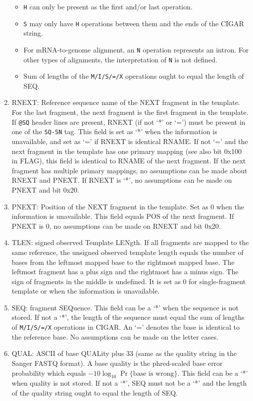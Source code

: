 \documentclass[10pt]{article}
\begin{document}
\begin{enumerate}
\begin{center}
  \end{center}
  \begin{itemize}
  \item {\tt H} can only be present as the first and/or last operation.
  \item {\tt S} may only have {\tt H} operations between them and the
    ends of the {\sf CIGAR} string.
  \item For mRNA-to-genome alignment, an {\tt N} operation represents an
    intron. For other types of alignments, the interpretation of {\tt N}
    is not defined.
  \item Sum of lengths of the {\tt M/I/S/=/X} operations ought to equal
    the length of {\sf SEQ}.
  \end{itemize}
\item {\sf RNEXT}: Reference sequence name of the NEXT fragment in the
  template. For the last fragment, the next fragment is the first
  fragment in the template. If {\tt @SQ} header lines are present, {\sf
    RNEXT} (if not `*' or `=') must be present in one of the {\tt SQ-SN}
  tag. This field is set as `*' when the information is unavailable, and
  set as `=' if {\sf RNEXT} is identical {\sf RNAME}. If not `=' and the
  next fragment in the template has one primary mapping (see also bit
  0x100 in {\sf FLAG}), this field is identical to {\sf RNAME} of the
  next fragment.  If the next fragment has multiple primary mappings, no
  assumptions can be made about {\sf RNEXT} and {\sf PNEXT}.  If {\sf
    RNEXT} is `*', no assumptions can be made on {\sf PNEXT} and bit
  0x20.
\item {\sf PNEXT}: Position of the NEXT fragment in the template. Set as
  0 when the information is unavailable. This field equals {\sf POS} of
  the next fragment. If {\sf PNEXT} is 0, no assumptions can be made on
  {\sf RNEXT} and bit 0x20.
\item {\sf TLEN}: signed observed Template LENgth. If all fragments are
  mapped to the same reference, the unsigned observed template length
  equals the number of bases from the leftmost mapped base to the
  rightmost mapped base. The leftmost fragment has a plus sign and the
  rightmost has a minus sign. The sign of fragments in the middle is
  undefined. It is set as 0 for single-fragment template or when the
  information is unavailable.
\item {\sf SEQ}: fragment SEQuence. This field can be a `*' when the
  sequence is not stored. If not a `*', the length of the sequence must
  equal the sum of lengths of {\tt M/I/S/=/X} operations in {\sf CIGAR}.
  An `=' denotes the base is identical to the reference base. No
  assumptions can be made on the letter cases.
\item {\sf QUAL}: ASCII of base QUALity plus 33 (same as the quality
  string in the Sanger FASTQ format). A base quality is the phred-scaled
  base error probability which equals $-10\log_{10}\Pr\{\mbox{base is
    wrong}\}$. This field can be a `*' when quality is not stored. If
  not a `*', {\sf SEQ} must not be a `*' and the length of the quality string
  ought to equal the length of {\sf SEQ}.
\end{enumerate}
\end{document}
